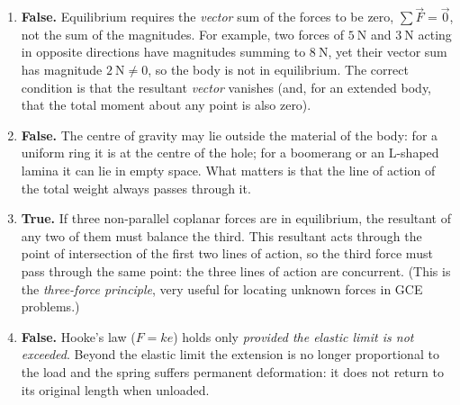 \documentclass[11pt]{article}
\newcommand{\cle}[1]{{\popxbold\color{popdark}#1}}
\begin{document}
\begin{corrige}
\begin{enumerate}
\item \textbf{False.} Equilibrium requires the \emph{vector} sum of the forces to be zero, $\sum\vec{F}=\vec{0}$, not the sum of the magnitudes. For example, two forces of $5\ \mathrm{N}$ and $3\ \mathrm{N}$ acting in opposite directions have magnitudes summing to $8\ \mathrm{N}$, yet their vector sum has magnitude $2\ \mathrm{N}\neq 0$, so the body is not in equilibrium. The correct condition is that the resultant \emph{vector} vanishes (and, for an extended body, that the total moment about any point is also zero).
\item \textbf{False.} The centre of gravity may lie outside the material of the body: for a uniform ring it is at the centre of the hole; for a boomerang or an L-shaped lamina it can lie in empty space. What matters is that the line of action of the total weight always passes through it.
\item \textbf{True.} If three non-parallel coplanar forces are in equilibrium, the resultant of any two of them must balance the third. This resultant acts through the point of intersection of the first two lines of action, so the third force must pass through the same point: the three lines of action are \cle{concurrent}. (This is the \emph{three-force principle}, very useful for locating unknown forces in GCE problems.)
\item \textbf{False.} Hooke's law ($F=ke$) holds only \emph{provided the elastic limit is not exceeded}. Beyond the elastic limit the extension is no longer proportional to the load and the spring suffers permanent deformation: it does not return to its original length when unloaded.
\end{enumerate}
\end{corrige}
\end{document}

